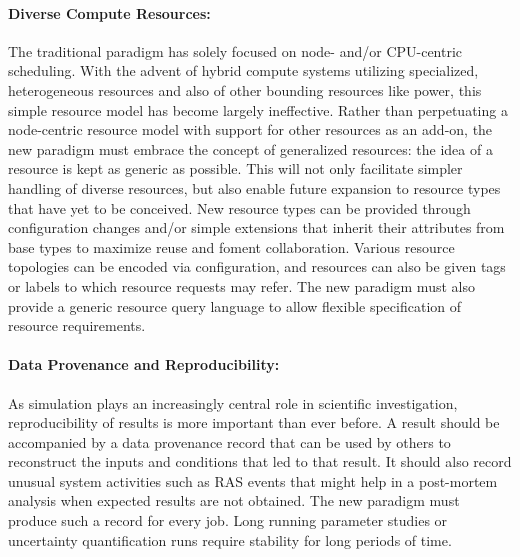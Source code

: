 \documentclass[10pt]{article}
\begin{document}
\paragraph{Diverse Compute Resources:}
The traditional paradigm has solely focused on node- and/or CPU-centric
scheduling. With the advent of hybrid compute systems utilizing specialized,
heterogeneous resources and also of other bounding resources like power, 
this simple resource model has become largely ineffective. 
Rather than
perpetuating a node-centric resource model with support for other
resources as an add-on, the new paradigm must embrace the concept of generalized resources: 
the idea of a resource is kept as generic as possible. This will not only facilitate 
simpler handling of diverse resources, but also enable future expansion to resource types that have yet to
be conceived. New resource types can be provided through configuration changes
and/or simple extensions that inherit their attributes from base types 
to maximize reuse and foment collaboration. Various resource topologies
can be encoded via configuration, and resources can also be given tags or labels
to which resource requests may refer. 
The new paradigm must also provide a generic resource query language to allow flexible
specification of resource requirements.


\paragraph{Data Provenance and Reproducibility:}
As simulation plays an increasingly central role in scientific
investigation, reproducibility of results is more important than ever
before. A result should be accompanied by a data provenance record that
can be used by others to reconstruct the inputs and conditions that led to
that result. It should also record unusual system activities 
such as RAS events that might help in a post-mortem analysis 
when expected results are not obtained.
The new paradigm must produce such a record for every job.
Long running parameter studies or uncertainty quantification runs
require stability for long periods of time. 
%
\end{document}
